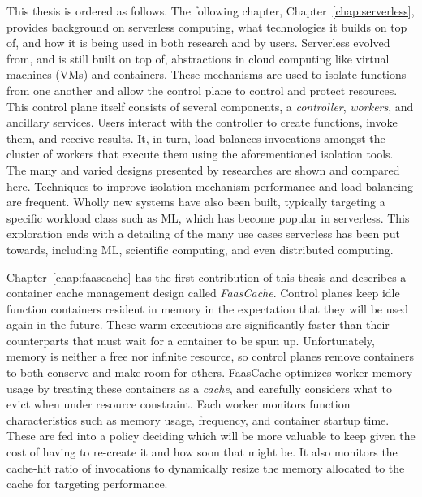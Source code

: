 This thesis is ordered as follows.
The following chapter, Chapter~\ref{chap:serverless}, provides background on serverless computing, what technologies it builds on top of, and how it is being used in both research and by users.
Serverless evolved from, and is still built on top of, abstractions in cloud computing like virtual machines (VMs) and containers.
These mechanisms are used to isolate functions from one another and allow the control plane to control and protect resources.
This control plane itself consists of several components, a \emph{controller}, \emph{workers}, and ancillary services.
Users interact with the controller to create functions, invoke them, and receive results.
It, in turn, load balances invocations amongst the cluster of workers that execute them using the aforementioned isolation tools.
The many and varied designs presented by researches are shown and compared here.
Techniques to improve isolation mechanism performance and load balancing are frequent.
Wholly new systems have also been built, typically targeting a specific workload class such as ML, which has become popular in serverless.
This exploration ends with a detailing of the many use cases serverless has been put towards, including ML, scientific computing, and even distributed computing.

Chapter~\ref{chap:faascache} has the first contribution of this thesis and describes a container cache management design called \emph{FaasCache}.
Control planes keep idle function containers resident in memory in the expectation that they will be used again in the future.
These warm executions are significantly faster than their counterparts that must wait for a container to be spun up.
Unfortunately, memory is neither a free nor infinite resource, so control planes remove containers to both conserve and make room for others.
FaasCache optimizes worker memory usage by treating these containers as a \emph{cache}, and carefully considers what to evict when under resource constraint.
Each worker monitors function characteristics such as memory usage, frequency, and container startup time.
These are fed into a policy deciding which will be more valuable to keep given the cost of having to re-create it and how soon that might be.
It also monitors the cache-hit ratio of invocations to dynamically resize the memory allocated to the cache for targeting performance.


